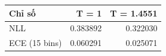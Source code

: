 \begin{tabularx}{\linewidth}{>{\raggedright\arraybackslash}Xrr}
\toprule
Chỉ số & T = 1 & T = 1.4551\\\midrule
NLL & 0.383892 & 0.322030\\
ECE (15 bins) & 0.060291 & 0.025071\\
\bottomrule\end{tabularx}
